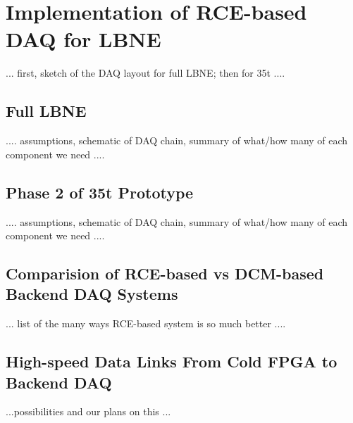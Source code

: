 \section{Implementation of RCE-based DAQ for LBNE}

...  first, sketch of the DAQ layout for full LBNE;  then for 35t ....

\subsection{Full LBNE}

....  assumptions, schematic of DAQ chain, summary of what/how many of each component we need  ....  


\subsection{Phase 2 of 35t Prototype}


....  assumptions, schematic of DAQ chain, summary of what/how many of each component we need  ....  


\subsection{Comparision of RCE-based vs DCM-based Backend DAQ Systems}

... list of the many ways RCE-based system is so much better  ....

\subsection{High-speed Data Links From Cold FPGA to Backend DAQ}

...possibilities and our plans on this ...